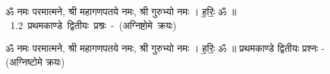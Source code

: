 \documentclass[17pt]{extarticle}
\begin{document}
\begin{titlepage}
    \begin{center}
 
\begin{sanskrit}
    { \Large
    ॐ नमः परमात्मने, श्री महागणपतये नमः, 
श्री गुरुभ्यो नमः । ह॒रिः॒ ॐ ॥ 
    }
    \\
    \vspace{2.5cm}
    \mbox{ \Huge
    1.2     प्रथमकाण्डे द्वितीयः प्रश्नः - (अग्निष्टोमे क्रयः)   }
\end{sanskrit}
\end{center}

\end{titlepage}
\tableofcontents

ॐ नमः परमात्मने, श्री महागणपतये नमः, 
श्री गुरुभ्यो नमः । ह॒रिः॒ ॐ ॥      प्रथमकाण्डे द्वितीयः प्रश्नः - (अग्निष्टोमे क्रयः) \newline

\end{document}
